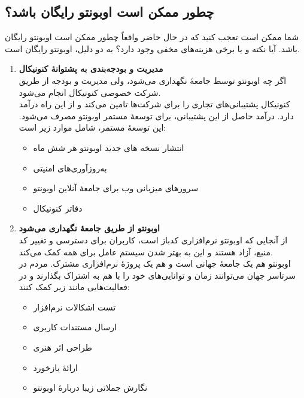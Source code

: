 \subsection{چطور ممکن است اوبونتو رایگان باشد؟}
شما ممکن است تعجب کنید که در حال حاضر واقعاً چطور ممکن است اوبونتو رایگان باشد. آیا نکته و یا برخی هزینه‌های مخفی وجود دارد؟ به دو دلیل، اوبونتو رایگان است.\\
\begin{enumerate}
\item \textbf{مدیریت و بودجه‌بندی به پشتوانهٔ کنونیکال}\\
اگر چه  اوبونتو توسط جامعهٔ  نگهداری می‌شود، ولی مدیریت و بودجه از طریق شرکت خصوصی کنونیکال انجام می‌شود.\\
کنونیکال پشتیبانی‌های تجاری را برای شرکت‌ها تامین می‌کند و از این راه درآمد دارد. درآمد حاصل از این پشتیبانی، برای توسعهٔ مستمر اوبونتو مصرف می‌شود. این توسعهٔ مستمر، شامل موارد زیر است:
\begin{itemize}
\item انتشار نسخه های جدید اوبونتو هر شش ماه
\item به‌روزآوری‌های امنیتی
\item سرورهای میزبانی وب برای جامعهٔ آنلاین اوبونتو 
\item دفاتر کنونیکال
\end{itemize}
\item \textbf{اوبونتو از طریق جامعهٔ  نگهداری می‌شود}\\
از آنجایی که اوبونتو نرم‌افزاری کدباز است، کاربران برای دسترسی و تغییر کد منبع، آزاد هستند و این به بهتر شدن سیستم عامل برای همه کمک می‌کند.\\
اوبونتو هم یک جامعهٔ جهانی است و هم یک پروژهٔ نرم‌افزاری مشترک. مردم در سرتاسر جهان می‌توانند زمان و توانایی‌های خود را با هم به اشتراک بگذارند و در فعالیت‌هایی مانند زیر کمک کنند:
\begin{itemize}
\item تست اشکالات نرم‌افزار
\item ارسال مستندات کاربری
\item طراحی اثر هنری
\item ارائهٔ بازخورد
\item نگارش جملاتی زیبا دربارهٔ اوبونتو
\end{itemize}
\end{enumerate}

